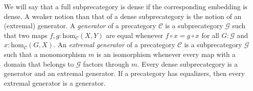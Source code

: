 \documentclass[reqno]{amsart}
\theoremstyle{definition}
\theoremstyle{remark}
\newcommand{\fs}[1]{\mathrm{#1}}
\newcommand{\scat}[1]{\mathcal{#1}}
\renewcommand{\hom}{\fs{hom}}
\numberwithin{figure}{section}
\begin{document}
We will say that a full subprecategory is dense if the corresponding embedding is dense.
A weaker notion than that of a dense subprecategory is the notion of an (extremal) generator.
A \emph{generator} of a precategory $\scat{C}$ is a subprecategory $\scat{G}$ such that two maps $f,g : \hom_\scat{C}(X,Y)$ are equal whenever $f \circ x = g \circ x$ for all $G : \scat{G}$ and $x : \hom_\scat{C}(G,X)$.
An \emph{extremal generator} of a precategory $\scat{C}$ is a subprecategory $\scat{G}$ such that a monomorphism $m$ is an isomorphism whenever every map with a domain that belongs to $\scat{G}$ factors through $m$.
Every dense subprecategory is a generator and an extremal generator.
If a precategory has equalizers, then every extremal generator is a generator.



\end{document}
